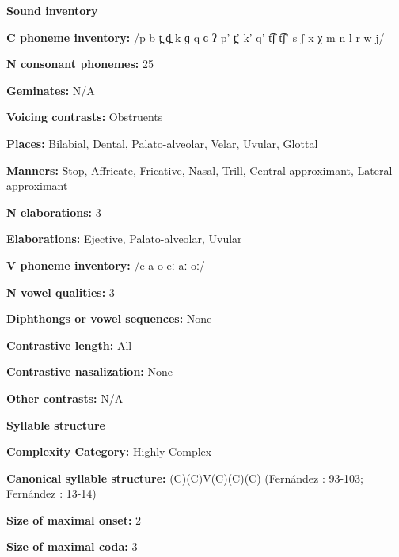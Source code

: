 \textbf{Sound inventory}



\textbf{C phoneme inventory:} /p b t̪ d̪ k ɡ q ɢ ʔ p’ t̪’ k’ q’ t͡ʃ t͡ʃ’ s ʃ x χ m n l r w j/



\textbf{N consonant phonemes:} 25



\textbf{Geminates:} N/A



\textbf{Voicing contrasts:} Obstruents



\textbf{Places:} Bilabial, Dental, Palato-alveolar, Velar, Uvular, Glottal



\textbf{Manners:} Stop, Affricate, Fricative, Nasal, Trill, Central approximant, Lateral approximant



\textbf{N elaborations:} 3



\textbf{Elaborations:} Ejective, Palato-alveolar, Uvular



\textbf{V phoneme inventory:} /e a o eː aː oː/



\textbf{N vowel qualities:} 3



\textbf{Diphthongs or vowel sequences:} None



\textbf{Contrastive length:} All



\textbf{Contrastive nasalization:} None



\textbf{Other contrasts:} N/A



\textbf{Syllable structure}



\textbf{Complexity Category:} Highly Complex



\textbf{Canonical syllable structure:} (C)(C)V(C)(C)(C) (Fernández \citealt{Garay1998}: 93-103; Fernández \citealt{GarayHernández2006}: 13-14)



\textbf{Size of maximal onset:} 2



\textbf{Size of maximal coda:} 3



